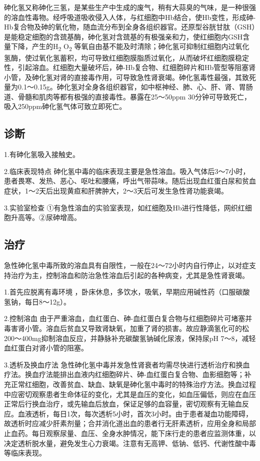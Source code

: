 砷化氢又称砷化三氢，是某些生产中生成的废气，稍有大蒜臭的气味，是一种很强的溶血性毒物。经呼吸道吸收侵入人体，与红细胞中Hb结合，使Hb变性，形成砷-Hb复合物及砷的氧化物，随血流分布到全身各组织器官。还原型谷胱甘肽（GSH）是能稳定细胞的含巯基酶，砷化氢对含巯基的有极强亲和力，使红细胞内GSH含量下降，产生的H\textsubscript{2}
O\textsubscript{2}
等氧自由基不能及时清除；砷化氢可抑制红细胞内过氧化氢酶，使过氧化氢蓄积，均可导致红细胞膜脂质过氧化，从而破坏红细胞膜稳定性，引起溶血。红细胞大量破坏后，砷-Hb复合物、红细胞碎片和Hb管型等阻塞肾小管，及砷化氢对肾的直接毒作用，可导致急性肾衰竭。砷化氢毒性最强，其致死量为0.1～0.15g。砷化氢对全身各组织器官，如中枢神经、肺、心、肝、肾、胃肠道、骨髓和肌肉等都有极强的直接毒性。暴露在25～50ppm
30分钟可导致死亡，吸入250ppm砷化氢气体可致立即死亡。

\subsection{诊断}

1.有砷化氢吸入接触史。

2.临床表现特点
砷化氢中毒的临床表现主要是急性溶血。吸入气体后3～7小时，患者畏寒、发热、恶心、呕吐和腰痛，呼出气带蒜味。随后出现血红蛋白尿和贫血症状，1～2天后出现黄疸和肝脾肿大，2～3天后可发生急性肾功能衰竭。

3.实验室检查
①有急性溶血的实验室表现，如红细胞及Hb进行性降低，网织红细胞升高等。②尿砷增高。

\subsection{治疗}

急性砷化氢中毒所致的溶血具有自限性，一般在24～72小时内自行停止，以对症支持治疗为主，控制溶血和防治急性溶血后引起的各种病变，尤其是急性肾衰竭。

1.首先应脱离有毒环境
，卧床休息，多饮水，吸氧，早期应用碱性药（口服碳酸氢钠，每日8～12g）。

2.控制溶血
由于严重溶血，血红蛋白、砷-血红蛋白复合物与红细胞碎片可堵塞并毒害肾小管。溶血后贫血又导致肾缺氧，加重了肾的损害。故应静滴氢化可的松200～400mg抑制溶血反应，并静脉补充碳酸氢钠碱化尿液，保持尿pH
7～8，减轻血红蛋白对肾小管的阻塞。

3.透析及换血疗法
急性砷化氢中毒并发急性肾衰者均需尽快进行透析治疗和换血疗法。换血疗法能排出血液内红细胞碎片、砷-血红蛋白复合物、血影细胞等；补充正常红细胞，改善贫血、缺血、缺氧是砷化氢中毒时的特殊治疗方法。换血过程中应密切观察患者生命体征的变化，尤其是血压的变化，如血压偏低，则应在血压正常后行换血治疗，或先输血后放血，保证足够的血容量，密切观察有无输血反应。血液透析，每日1次，每次透析5小时，首次3小时。由于患者凝血功能障碍，故透析时应减少肝素剂量；合并消化道出血的患者行无肝素透析，应用全身和局部止血药。每日观察尿量、血压、全身水肿情况，能下床行走的患者应监测体重，以决定透析脱水量，避免发生心力衰竭。注意有无高钾、低钠、低钙、代谢性酸中毒等临床表现。

